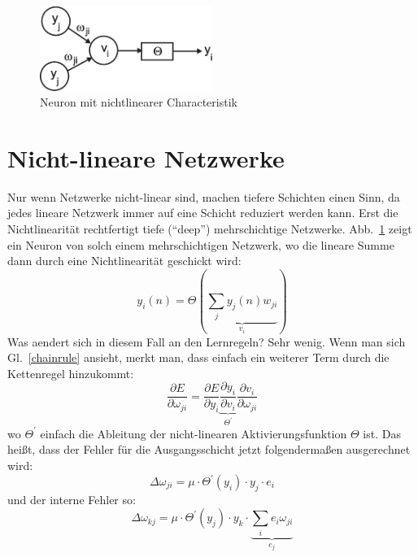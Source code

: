 \documentclass[12pt]{article}
\begin{document}
\begin{figure}[!hbt]
\begin{center}
\mbox{\includegraphics[width=0.5\textwidth]{nonlin}}
\end{center}
\caption{Neuron mit nichtlinearer Characteristik
\label{nonlin}}
\end{figure}

\section{Nicht-lineare Netzwerke}
Nur wenn Netzwerke nicht-linear sind, machen tiefere Schichten einen
Sinn, da jedes lineare Netzwerk immer auf eine Schicht reduziert
werden kann.  Erst die Nichtlinearität rechtfertigt tiefe (``deep'')
mehrschichtige Netzwerke.  Abb.~\ref{nonlin} zeigt ein Neuron von
solch einem mehrschichtigen Netzwerk, wo die lineare Summe dann durch
eine Nichtlinearität geschickt wird:
\begin{equation}
  y_i(n) = \Theta\left(\underbrace{\sum_j y_j(n) w_{ji}}_{v_i} \right) \label{nonlinear_sum}
\end{equation}
Was aendert sich in diesem Fall an den Lernregeln? Sehr wenig. Wenn man sich Gl.~\ref{chainrule} ansieht, merkt man, dass einfach
ein weiterer Term durch die Kettenregel hinzukommt:
 \begin{equation}
 \frac{\partial E}{\partial \omega_{ji}}  = \frac{\partial E}{\partial y_i} \underbrace{\frac{\partial y_i}{\partial v_i}}_{\Theta^\prime} \frac{\partial v_i}{\partial \omega_{ji}}
 \end{equation}
 wo $\Theta^\prime$ einfach die Ableitung der nicht-linearen Aktivierungsfunktion $\Theta$ ist. Das heißt, dass der Fehler für die
 Ausgangsschicht jetzt folgendermaßen ausgerechnet wird:
\begin{equation}
  \Delta\omega_{ji} = \mu \cdot \Theta^\prime(y_i) \cdot y_j \cdot e_i 
\end{equation}
und der interne Fehler so:
\begin{equation}
\Delta\omega_{kj} = \mu \cdot \Theta^\prime(y_j) \cdot y_k \cdot \underbrace{\sum_i e_i \omega_{ji}}_{e_j} 
\end{equation}
\end{document}
